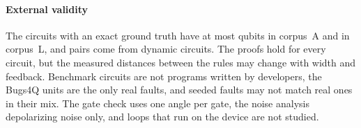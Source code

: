 \paragraph*{External validity}
The circuits with an exact ground truth have at most \numSizeAMaxQubits{} qubits in corpus~A and \numSubjLMaxQubits{} in corpus~L, and
\numNDynamicPairs{} pairs come from dynamic circuits. The proofs hold for every circuit, but the measured distances
between the rules may change with width and feedback. Benchmark circuits are not programs written by developers, the
\numBugsFourQUnits{} Bugs4Q units are the only real faults, and seeded faults may not match real ones in their mix. The
gate check uses one angle per gate, the noise analysis depolarizing noise only, and loops that run on the device are
not studied.

